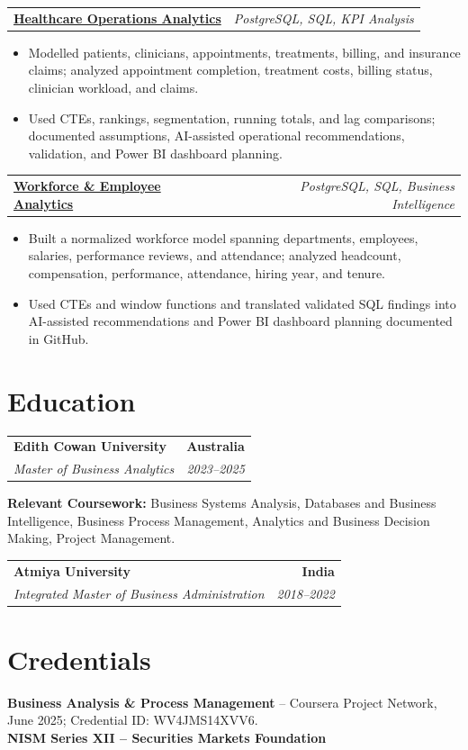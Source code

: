 \documentclass[letterpaper,10pt]{article}
\makeatletter
\newcommand{\role}[4]{%
  \begin{tabularx}{\textwidth}{@{}Xr@{}}
    \textbf{#1} & \textbf{#2} \\
    \textit{#3} & \textit{#4}
  \end{tabularx}\vspace{-1pt}
}
\newcommand{\project}[2]{%
  \begin{tabularx}{\textwidth}{@{}Xr@{}}
    \textbf{#1} & \textit{#2}
  \end{tabularx}\vspace{-1pt}
}
\makeatother
\begin{document}
\project{\href{https://github.com/jainalimehta/Healthcare-Analytics}{Healthcare Operations Analytics}}{PostgreSQL, SQL, KPI Analysis}
\begin{itemize}
  \item Modelled patients, clinicians, appointments, treatments, billing, and insurance claims; analyzed appointment completion, treatment costs, billing status, clinician workload, and claims.
  \item Used CTEs, rankings, segmentation, running totals, and lag comparisons; documented assumptions, AI-assisted operational recommendations, validation, and Power BI dashboard planning.
\end{itemize}
\vspace{1pt}

\project{\href{https://github.com/jainalimehta/HR-Analytics}{Workforce \& Employee Analytics}}{PostgreSQL, SQL, Business Intelligence}
\begin{itemize}
  \item Built a normalized workforce model spanning departments, employees, salaries, performance reviews, and attendance; analyzed headcount, compensation, performance, attendance, hiring year, and tenure.
  \item Used CTEs and window functions and translated validated SQL findings into AI-assisted recommendations and Power BI dashboard planning documented in GitHub.
\end{itemize}

\section{Education}
\role{Edith Cowan University}{Australia}{Master of Business Analytics}{2023--2025}
\small\textbf{Relevant Coursework:} Business Systems Analysis, Databases and Business Intelligence, Business Process Management, Analytics and Business Decision Making, Project Management.\\[2pt]
\role{Atmiya University}{India}{Integrated Master of Business Administration}{2018--2022}

\section{Credentials}
\small\textbf{Business Analysis \& Process Management} -- Coursera Project Network, June 2025; Credential ID: WV4JMS14XVV6.\\[-0.2pt]
\small\textbf{NISM Series XII -- Securities Markets Foundation}
\end{document}
